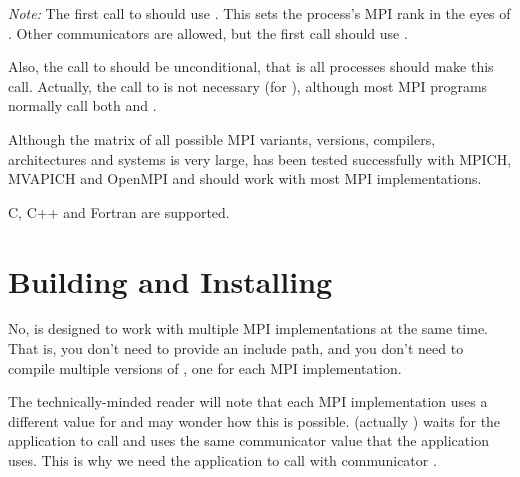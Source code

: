 \documentclass[11pt,letterpaper]{report}
\begin{document}
\emph{Note:} The first call to  should use .
This sets the process's MPI rank in the eyes of \hpcrun{}.
Other communicators are allowed, but the first call should use .

Also, the call to  should be unconditional, that is all processes should make this call.
Actually, the call to  is not necessary (for \hpcrun{}), although most MPI programs normally call both  and .



\answer{}
Although the matrix of all possible MPI variants, versions, compilers, architectures and systems is very large, \HPCToolkit{} has been tested successfully with MPICH, MVAPICH and OpenMPI and should work with most MPI implementations.



\answer{}
C, C++ and Fortran are supported.


\section{Building and Installing \HPCToolkit{}}


\answer{}
No, \HPCToolkit{} is designed to work with multiple MPI implementations at the same time.
That is, you don't need to provide an  include path, and you don't need to compile multiple versions of \HPCToolkit{}, one for each MPI implementation.

The technically-minded reader will note that each MPI implementation uses a different value for  and may wonder how this is possible.
\hpcrun{} (actually ) waits for the application to call  and uses the same communicator value that the application uses.
This is why we need the application to call  with communicator .


\end{document}
